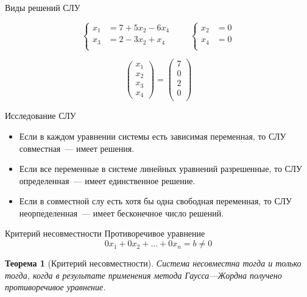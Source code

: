\documentclass[unicode,11pt,notheorems]{beamer}
\newtheorem{theorem}{Теорема}
\begin{document}
\begin{frame}[allowframebreaks]{Виды решений СЛУ}{}
\begin{itemize}
		$$	
		\left\lbrace
		\begin{aligned}
			x_1 &= 7+ 5x_2 - 6x_4\\
			x_3 &= 2-3x_2 + x_4\\
		\end{aligned}
		\right.
		\qquad 
		\left\lbrace
		\begin{aligned}
				x_2 &= 0\\
				x_4 &= 0\\
		\end{aligned}
		\right.
		$$

		$$
		\begin{pmatrix}
			x_1 \\ x_2\\ x_3\\ x_4
		\end{pmatrix}
		= 
		\begin{pmatrix}
			7\\
			0\\
			2\\
			0\\
		\end{pmatrix}
		$$		


	\end{itemize}
\end{frame}


\begin{frame}{Исследование СЛУ}

\begin{itemize}

\item 
	Если в каждом уравнении системы есть зависимая переменная, то СЛУ совместная~--- имеет решения.

\bigskip
\item 
	Если все переменные в системе линейных уравнений разрешенные, то СЛУ определенная~--- имеет единственное решение. 
\item 
	Если в совместной слу  есть хотя бы одна свободная переменная, то СЛУ неорпеделенная~--- имеет бесконечное число решений. 

	
\end{itemize}



\end{frame}
\begin{frame}{Критерий несовместности}
\alert{Противоречивое уравнение}
$$
	0x_1+0x_2+\ldots+0x_n=b\neq 0
$$
\begin{theorem}[Критерий несовместности]
Система несовместна тогда и только тогда, когда  в результате применения метода Гаусса---Жордна получено противоречивое уравнение.
\end{theorem}
\end{frame}
\end{document}
